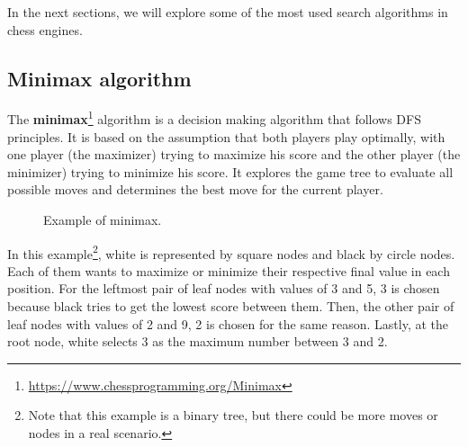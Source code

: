 \noindent In the next sections, we will explore some of the most used search algorithms in chess engines.

\subsection{Minimax algorithm}

The \textbf{minimax}\footnote{\url{https://www.chessprogramming.org/Minimax}} algorithm is a decision making algorithm that follows DFS principles. It is based on the assumption that both players play optimally, with one player (the maximizer) trying to maximize his score and the other player (the minimizer) trying to minimize his score. It explores the game tree to evaluate all possible moves and determines the best move for the current player.

\begin{figure}[H]
    \centering
    \caption{Example of minimax.}
    \label{fig:minimax}
\end{figure}

\noindent In this example\footnote{Note that this example is a binary tree, but there could be more moves or nodes in a real scenario.}, white is represented by square nodes and black by circle nodes. Each of them wants to maximize or minimize their respective final value in each position. For the leftmost pair of leaf nodes with values of 3 and 5, 3 is chosen because black tries to get the lowest score between them. Then, the other pair of leaf nodes with values of 2 and 9, 2 is chosen for the same reason. Lastly, at the root node, white selects 3 as the maximum number between 3 and 2.

